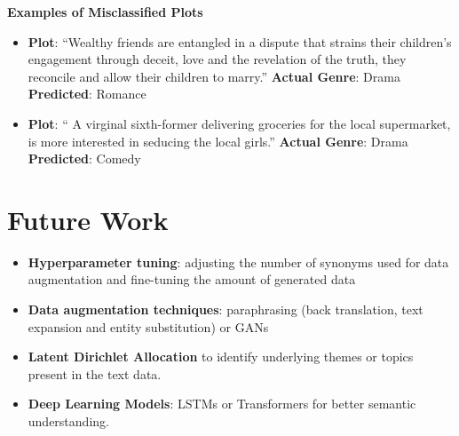 \documentclass[3pt, sigconf, nonacm]{acmart}
\begin{document}
\textbf{Examples of Misclassified Plots}

\begin{itemize}
    \item \textbf{Plot}: ``Wealthy friends are entangled in a dispute that strains their children's engagement through deceit, love and the revelation of the truth, they reconcile and allow their children to marry.'' \textbf{Actual Genre}: Drama  \textbf{Predicted}: Romance
    \item \textbf{Plot}: `` A virginal sixth-former delivering groceries for the local supermarket, is more interested in seducing the local girls.'' \textbf{Actual Genre}: Drama  \textbf{Predicted}: Comedy
\end{itemize}

\section{Future Work}

\begin{itemize}
    \item \textbf{Hyperparameter tuning}: adjusting the number of synonyms used for data augmentation and fine-tuning the amount of generated data 
    \item \textbf{Data augmentation techniques}: paraphrasing (back translation, text expansion and entity substitution) or GANs
    \item \textbf{Latent Dirichlet Allocation} to identify underlying themes or topics present in the text data.
    \item \textbf{Deep Learning Models}: LSTMs or Transformers for better semantic understanding.

\end{itemize}
\clearpage


\end{document}
